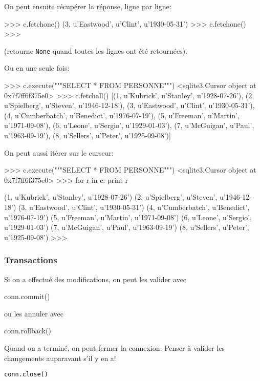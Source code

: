 On peut ensuite récupérer la réponse, ligne par ligne:
\begin{pyverbatim}
>>> c.fetchone()
(3, u'Eastwood', u'Clint', u'1930-05-31')
>>> c.fetchone()
>>>
\end{pyverbatim}
(retourne \lstinline{None} quand toutes les lignes ont été
retournées).

Ou en une seule fois:
{\small
\begin{pyverbatim}
>>> c.execute("""SELECT * FROM PERSONNE""")
<sqlite3.Cursor object at 0x7f7ff6f375e0>
>>> c.fetchall()
[(1, u'Kubrick', u'Stanley', u'1928-07-26'),
 (2, u'Spielberg', u'Steven', u'1946-12-18'),
 (3, u'Eastwood', u'Clint', u'1930-05-31'),
 (4, u'Cumberbatch', u'Benedict', u'1976-07-19'), 
 (5, u'Freeman', u'Martin', u'1971-09-08'), 
 (6, u'Leone', u'Sergio', u'1929-01-03'),
 (7, u'McGuigan', u'Paul', u'1963-09-19'), 
 (8, u'Sellers', u'Peter', u'1925-09-08')]
\end{pyverbatim}
}

On peut aussi itérer sur le curseur:

{\small
\begin{pyverbatim}
  >>> c.execute("""SELECT * FROM PERSONNE""")
<sqlite3.Cursor object at 0x7f7ff6f375e0>
>>> for r in c: 
      print r
    
(1, u'Kubrick', u'Stanley', u'1928-07-26')
(2, u'Spielberg', u'Steven', u'1946-12-18')
(3, u'Eastwood', u'Clint', u'1930-05-31')
(4, u'Cumberbatch', u'Benedict', u'1976-07-19')
(5, u'Freeman', u'Martin', u'1971-09-08')
(6, u'Leone', u'Sergio', u'1929-01-03')
(7, u'McGuigan', u'Paul', u'1963-09-19')
(8, u'Sellers', u'Peter', u'1925-09-08')
>>> 
\end{pyverbatim}
}

\subsubsection{Transactions}
Si on a effectué des modifications, on peut les valider avec
\begin{pyverbatim}
conn.commit()
\end{pyverbatim}
ou les annuler avec
\begin{pyverbatim}
conn.rollback()  
\end{pyverbatim}

Quand on a terminé, on peut fermer la connexion. Penser à valider les
changements auparavant s'il y en a!
\begin{lstlisting}
conn.close()
\end{lstlisting}

